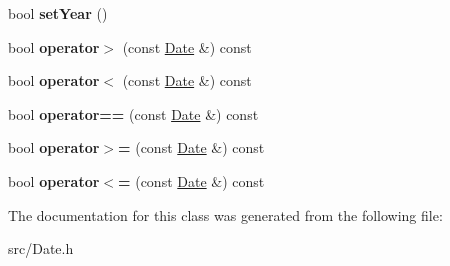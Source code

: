 \begin{DoxyCompactItemize}
\item 
\hypertarget{class_date_a7eb6d0e8d6a6bb2a78f5b5073e0a84a7}{bool {\bfseries set\+Year} ()}\label{class_date_a7eb6d0e8d6a6bb2a78f5b5073e0a84a7}

\item 
\hypertarget{class_date_a0bd06d545842c948cdca8ccc60d7d68d}{bool {\bfseries operator$>$} (const \hyperlink{class_date}{Date} \&) const }\label{class_date_a0bd06d545842c948cdca8ccc60d7d68d}

\item 
\hypertarget{class_date_a691bafd5bba9540f3c540f7327a758c2}{bool {\bfseries operator$<$} (const \hyperlink{class_date}{Date} \&) const }\label{class_date_a691bafd5bba9540f3c540f7327a758c2}

\item 
\hypertarget{class_date_ad54d8e4b8f2ad6df8eda3b8615c3c0b2}{bool {\bfseries operator==} (const \hyperlink{class_date}{Date} \&) const }\label{class_date_ad54d8e4b8f2ad6df8eda3b8615c3c0b2}

\item 
\hypertarget{class_date_ae4802fa52cf81f1a259b4a3b88bffc0d}{bool {\bfseries operator$>$=} (const \hyperlink{class_date}{Date} \&) const }\label{class_date_ae4802fa52cf81f1a259b4a3b88bffc0d}

\item 
\hypertarget{class_date_a6632fd56fe1c549ef0a257c85fd8eb3e}{bool {\bfseries operator$<$=} (const \hyperlink{class_date}{Date} \&) const }\label{class_date_a6632fd56fe1c549ef0a257c85fd8eb3e}

\end{DoxyCompactItemize}


The documentation for this class was generated from the following file\+:\begin{DoxyCompactItemize}
\item 
src/Date.\+h\end{DoxyCompactItemize}
